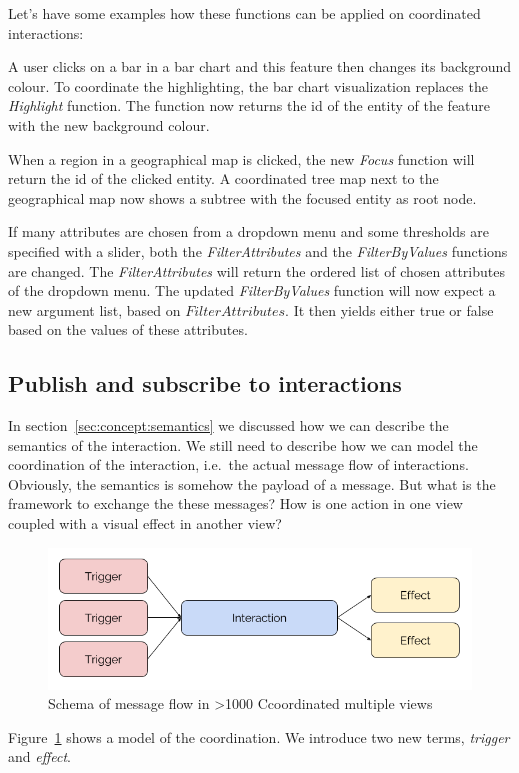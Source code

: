 \documentclass{article}
\newcommand\hmm[1]{\ifnum\ifhmode\spacefactor\else2000\fi>1000 \uppercase{#1}\else#1\fi}
\newcommand{\cmvs}{\hmm{c}oordinated multiple views}
\begin{document}
Let's have some examples how these functions can be applied on coordinated interactions:

A user clicks on a bar in a bar chart and this feature then changes its background colour.
To coordinate the highlighting, the bar chart visualization replaces the \emph{Highlight} function.
The function now returns the id of the entity of the feature with the new background colour.

When a region in a geographical map is clicked, the new \emph{Focus} function will return the id of the clicked entity.
A coordinated tree map next to the geographical map now shows a subtree with the focused entity as root node.

If many attributes are chosen from a dropdown menu and some thresholds are specified with a slider, both the \emph{FilterAttributes} and the \emph{FilterByValues} functions are changed.
The \emph{FilterAttributes} will return the ordered list of chosen attributes of the dropdown menu.
The updated \emph{FilterByValues} function will now expect a new argument list, based on $ FilterAttributes $.
It then yields either true or false based on the values of these attributes.

\subsection{Publish and subscribe to interactions}

In section~\ref{sec:concept:semantics} we discussed how we can describe the semantics of the interaction.
We still need to describe how we can model the coordination of the interaction, i.e.\ the actual message flow of interactions.
Obviously, the semantics is somehow the payload of a message.
But what is the framework to exchange the these messages?
How is one action in one view coupled with a visual effect in another view?
\begin{figure}[h!]
  \centering
  \includegraphics[width=\textwidth]{images/trigger-effect.png}
  \caption{Schema of message flow in \cmvs{}}
  \label{fig:concept:trigger-effect}
\end{figure}
Figure~\ref{fig:concept:trigger-effect} shows a model of the coordination.
We introduce two new terms, \emph{trigger} and \emph{effect}.
\end{document}
